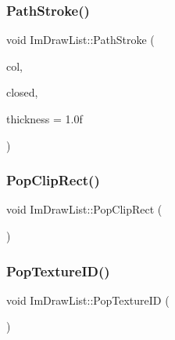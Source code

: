 \mbox{\label{struct_im_draw_list_ac3172e376a4b77915bb22b6d8092b8b2}} 
\subsubsection{\texorpdfstring{Path\+Stroke()}{PathStroke()}}
{\footnotesize\ttfamily void Im\+Draw\+List\+::\+Path\+Stroke (\begin{DoxyParamCaption}\item[{\mbox{\hyperlink{imgui_8h_a118cff4eeb8d00e7d07ce3d6460eed36}{Im\+U32}}}]{col,  }\item[{bool}]{closed,  }\item[{float}]{thickness = {\ttfamily 1.0f} }\end{DoxyParamCaption})\hspace{0.3cm}{\ttfamily [inline]}}

\mbox{\label{struct_im_draw_list_a44f40c59ca755f559020f5a7fa81103a}} 
\subsubsection{\texorpdfstring{Pop\+Clip\+Rect()}{PopClipRect()}}
{\footnotesize\ttfamily void Im\+Draw\+List\+::\+Pop\+Clip\+Rect (\begin{DoxyParamCaption}{ }\end{DoxyParamCaption})}

\mbox{\label{struct_im_draw_list_ade9286c5ca58753f7bd571b30e2ff76c}} 
\subsubsection{\texorpdfstring{Pop\+Texture\+I\+D()}{PopTextureID()}}
{\footnotesize\ttfamily void Im\+Draw\+List\+::\+Pop\+Texture\+ID (\begin{DoxyParamCaption}{ }\end{DoxyParamCaption})}

